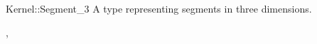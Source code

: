 \begin{ccRefConcept}{Kernel::Segment_3}
A type representing segments in three dimensions.

\ccRefines
{},

\ccSeeAlso
{}

\end{ccRefConcept}
